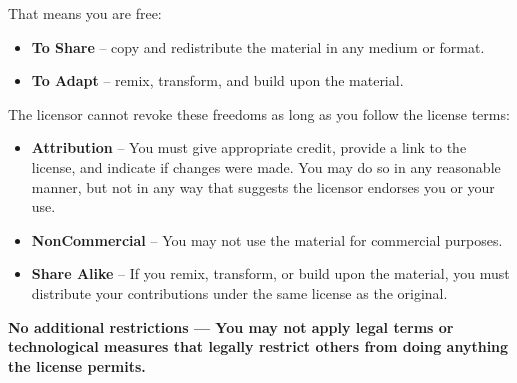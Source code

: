    \scriptsize
   \noindent
    That means you are free:
      \begin{itemize}
        \setlength{\itemsep}{0pt}
        \setlength{\parskip}{0pt}
        \setlength{\parsep}{0pt} 
          \item \textbf{To Share} -- copy and redistribute the material in any medium or format.
         \item \textbf{To Adapt} -- remix, transform, and build upon the material.
      \end{itemize}
    The licensor cannot revoke these freedoms as long as you follow the license terms: \par
      \begin{itemize}
        \setlength{\itemsep}{0pt}
        \setlength{\parskip}{0pt}
        \setlength{\parsep}{0pt}
          \item \textbf{Attribution} -- You must give appropriate credit, provide a link to the license, and indicate if changes were made. You may do so in any reasonable manner, but not in any way that suggests the licensor endorses you or your use. \par
          \item \textbf{NonCommercial} -- You may not use the material for commercial purposes. \par
          \item \textbf{Share Alike} -- If you remix, transform, or build upon the material, you must distribute your contributions under the same license as the original. \par
      \end{itemize}
    \textbf{No additional restrictions — You may not apply legal terms or technological measures that legally restrict others from doing anything the license permits.}

    \normalfont
    \normalsize

\clearpage